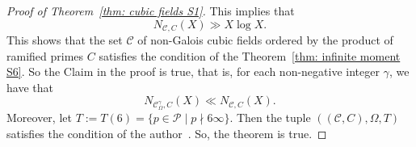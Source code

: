\documentclass[12pt,a4paper]{amsart}
\numberwithin{equation}{section}%
\theoremstyle{plain}%
\theoremstyle{definition}%
\theoremstyle{remark}%
\begin{document}
\begin{proof}[Proof of Theorem~\ref{thm: cubic fields S1}]
    	This implies that
    	\begin{equation*}
    		N_{\mathcal{C},C}(X)\gg X\log X.
    	\end{equation*}
    	This shows that the set $\mathcal{C}$ of non-Galois cubic fields ordered by the product of ramified primes $C$ satisfies the condition of the Theorem~\ref{thm: infinite moment S6}.
    	So the Claim in the proof is true, that is, for each non-negative integer $\gamma$, we have that
    	\begin{equation*}
    		N_{\mathcal{C}_{\Omega}^{\gamma},C}(X)\ll N_{\mathcal{C},C}(X).
    	\end{equation*}
    	Moreover, let $T:=T(6)=\{p\in\mathcal{P}\mid p\nmid 6\infty\}$.
    	Then the tuple $((\mathcal{C},C),\Omega,T)$ satisfies the condition of the author~\cite[Theorem 3.14]{wang2026invariant}.
    	So, the theorem is true.
    \end{proof}
    

    



\end{document}

